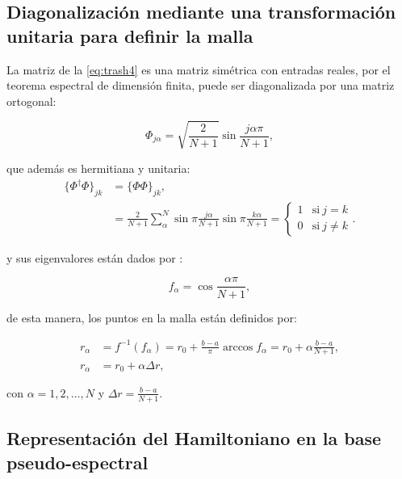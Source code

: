 \subsection{Diagonalización mediante una transformación unitaria para definir la malla}

La matriz de la \autoref{eq:trash4} es una matriz simétrica con entradas reales, por el teorema espectral de dimensión finita, puede ser diagonalizada por una matriz ortogonal:

\begin{equation}
  \label{eq:trash5}
  \Phi_{j\alpha} = \sqrt{\frac{2}{N+1}}\sin{\frac{j\alpha \pi}{N+1}},
\end{equation}

\noindent que además es hermitiana y unitaria:
\begin{align}
  \label{eq:unitaryproof}
  \{\Phi^{\dagger} \Phi\}_{jk} &= \{\Phi \Phi\}_{jk}, \\
                      &= \frac{2}{N+1} \sum_{\alpha}^{N} \sin{\pi\frac{j\alpha}{N+1}}\sin{\pi\frac{k\alpha}{N+1}} =
                        \begin{cases}
                          1 & \text{si}\ j=k \\
                          0 & \text{si}\ j\neq k
                        \end{cases}.
\end{align}


\noindent y sus eigenvalores están dados por \cite{Noschese2012}:

\begin{equation}
  \label{eq:trash7}
  f_{\alpha} = \cos{\frac{\alpha \pi}{N+1}},
\end{equation}

\noindent de esta manera, los puntos en la malla están definidos por:

\begin{align}
  \label{eq:malla}
  r_{\alpha} &= f^{-1}(f_{\alpha}) = r_0 + \frac{b-a}{\pi}\arccos{f_{\alpha}} = r_0 + \alpha \frac{b-a}{N+1}, \nonumber\\
  r_{\alpha} &= r_0 + \alpha \Delta r,
\end{align}

\noindent con $\alpha=1,2,\dots,N$ y $\Delta r = \frac{b-a}{N+1}$.


\subsection{Representación del Hamiltoniano en la base pseudo-espectral}

